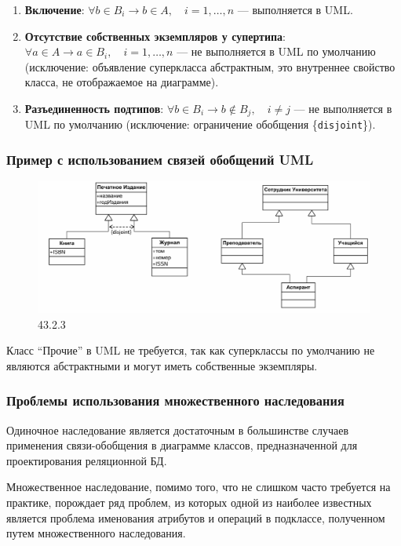 \documentclass[a4paper,12pt]{article}
\begin{document}
\begin{enumerate}
    \item \textbf{Включение}: $\forall b \in B_i \rightarrow b \in A, \quad i = 1, \ldots, n$ — выполняется в UML.
    \item \textbf{Отсутствие собственных экземпляров у супертипа}: $\forall a \in A \rightarrow a \in B_i, \quad i = 1, \ldots, n$ — не выполняется в UML по умолчанию (исключение: объявление суперкласса абстрактным, это внутреннее свойство класса, не отображаемое на диаграмме).
    \item \textbf{Разъединенность подтипов}: $\forall b \in B_i \rightarrow b \notin B_j, \quad i \neq j$ — не выполняется в UML по умолчанию (исключение: ограничение обобщения \{\texttt{disjoint}\}).
\end{enumerate}

\subsubsection{Пример с использованием связей обобщений UML}


\begin{figure}
    \centering
    \includegraphics[width=0.75\linewidth]{image2.png}
    \caption{43.2.3}
    \label{fig:enter-label}
\end{figure}
Класс ``Прочие'' в UML не требуется, так как суперклассы по умолчанию не являются абстрактными и могут иметь собственные экземпляры.

\subsubsection{Проблемы использования множественного наследования}

Одиночное наследование является достаточным в большинстве случаев применения связи-обобщения в диаграмме классов, предназначенной для проектирования реляционной БД.

Множественное наследование, помимо того, что не слишком часто требуется на практике, порождает ряд проблем, из которых одной из наиболее известных является проблема именования атрибутов и операций в подклассе, полученном путем множественного наследования.
\end{document}

